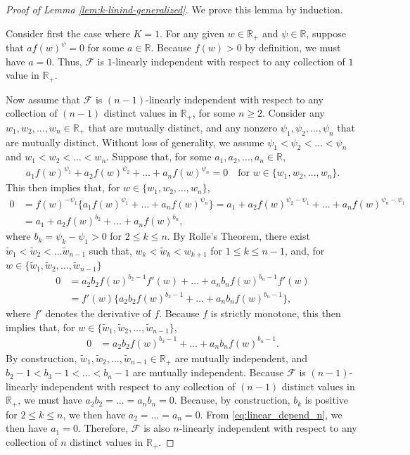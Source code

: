 \documentclass[11pt]{article}
\theoremstyle{definition}
\theoremstyle{remark}
\begin{document}
\begin{proof}[Proof of Lemma \ref{lem:k-linind-generalized}]
We prove this lemma by induction. 


Consider first the case where $K=1$. 
For any given $w \in \mathbb{R}_+$ and $\psi \in \mathbb{R}$, suppose that $a f(w)^{\psi} = 0$ for some $a\in \mathbb{R}$. 
Because $f(w)>0$ by definition, we must have $a = 0$. 
Thus, $\mathcal{F}$ is $1$-linearly independent with respect to any collection of $1$ value in $\mathbb{R}_+$. 


Now assume 
that $\mathcal{F}$ is $(n-1)$-linearly independent with respect to any collection of $(n-1)$ distinct values in $\mathbb{R}_+$, for some $n\ge 2$. 
Consider any $w_1, w_2, \ldots, w_n\in \mathbb{R}_+$ that are mutually distinct, and any nonzero $\psi_1, \psi_2, \ldots, \psi_n$ that are mutually distinct. 
Without loss of generality, we assume $\psi_1< \psi_2 < \ldots < \psi_n$
and 
$w_1 < w_2 < \ldots < w_n$. 
Suppose that, for some $a_1, a_2, \ldots, a_n \in \mathbb{R}$, 
\begin{align}\label{eq:linear_depend_n}
a_1 f(w)^{\psi_1} + a_2 f(w)^{\psi_2} + 
\ldots + 
a_n f(w)^{\psi_n} = 0 
\quad \text{for } 
w \in \{ w_1, w_2, \ldots, w_n \}. 
\end{align}
This then implies that, for $w \in \{ w_1, w_2, \ldots, w_n \}$, 
\begin{align*}
0 & = f(w)^{-\psi_1} \big\{ a_1 f(w)^{\psi_1} + 
\ldots + 
a_n f(w)^{\psi_n} \big\}
= a_1 + a_2 f(w)^{\psi_2-\psi_1} + 
\ldots + 
a_n f(w)^{\psi_n-\psi_1}\\
& = a_1 + a_2 f(w)^{b_2} + 
\ldots + 
a_n f(w)^{b_n}, 
\end{align*}
where $b_k = \psi_k-\psi_1 > 0$ for $2\le k \le n$. 
By Rolle’s Theorem, there exist $\tilde{w}_1 < \tilde{w}_2 < \ldots \tilde{w}_{n-1}$ such that, 
$w_k < \tilde{w}_k < w_{k+1}$ for $1\le k \le n-1$, and, 
for $w \in \{\tilde{w}_1, \tilde{w}_2, \ldots, \tilde{w}_{n-1}\}$
\begin{align*}
0 
& = a_2b_2 f(w)^{b_2-1} f'(w) + 
\ldots + 
a_n b_n f(w)^{b_n-1} f'(w) \\
&= 
f'(w) \big\{ 
a_2 b_2 f(w)^{b_2-1} + 
\ldots + 
a_n b_n f(w)^{b_n-1} 
\big\}, 
\end{align*}
where $f'$ denotes the derivative of $f$. 
Because $f$ is strictly monotone, this then implies that, for $w \in \{\tilde{w}_1, \tilde{w}_2, \ldots, \tilde{w}_{n-1}\}$, 
\begin{align*}
0 
& =
a_2 b_2 f(w)^{b_2-1} + 
\ldots + 
a_n b_n f(w)^{b_n-1}.  
\end{align*}
By construction, $\tilde{w}_1, \tilde{w}_2, \ldots, \tilde{w}_{n-1}\in \mathbb{R}_+$ are mutually independent, and $b_2-1 < b_3-1< \ldots < b_n-1$ are mutually independent. 
Because $\mathcal{F}$ is $(n-1)$-linearly independent with respect to any collection of $(n-1)$ distinct values in $\mathbb{R}_+$, we must have 
$a_2b_2 = \ldots = a_nb_n = 0$. 
Because, by construction, $b_k$ is positive for $2\le k \le n$, we then have $a_2 = \ldots = a_n = 0$. 
From \eqref{eq:linear_depend_n}, we then have $a_1 = 0$. 
Therefore, $\mathcal{F}$ is also $n$-linearly independent with respect to any collection of $n$ distinct values in $\mathbb{R}_+$. 


\end{proof}
\end{document}
